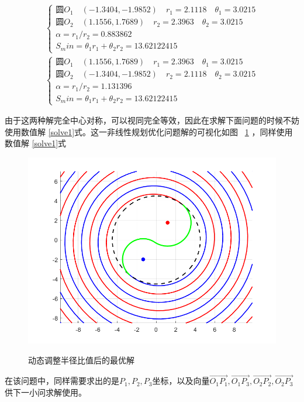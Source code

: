 \documentclass{cumcmthesis1}
\begin{document}
\begin{equation}
\begin{aligned}
    \begin{cases}
        \text{圆}O_1 \quad (-1.3404,-1.9852) \quad r_1=2.1118 \quad \theta_1=3.0215\\
        \text{圆}O_2 \quad (1.1556,1.7689) \quad r_2=2.3963 \quad \theta_2=3.0215\\
        \alpha=r_1/r_2=0.883862\\
        S_min=\theta_1 r_1+\theta_2 r_2=13.62122415
    \end{cases}
\end{aligned}
\label{solve1}
\end{equation}
\begin{align}
    \begin{cases}
        \text{圆}O_1 \quad (1.1556,1.7689) \quad r_1=2.3963 \quad \theta_1=3.0215\\
        \text{圆}O_2 \quad (-1.3404,-1.9852) \quad r_2=2.1118 \quad \theta_2=3.0215\\
        \alpha=r_1/r_2=1.131396\\
        S_min=\theta_1 r_1+\theta_2 r_2=13.62122415
    \end{cases}
\end{align}

由于这两种解完全中心对称，可以视同完全等效，因此在求解下面问题的时候不妨使用数值解
\eqref{solve1}式。这一非线性规划优化问题解的可视化如图 ~\ref{solving}   
，同样使用数值解
\eqref{solve1}式
\begin{figure}[ht]
    \caption{动态调整半径比值后的最优解}
    \centering    
    \includegraphics[width=0.7\linewidth]{111.png}
    \label{solving}
\end{figure}
\par
在该问题中，同样需要求出的是$P_1,P_2,P_3$坐标，以及向量$\overrightarrow{O_1 P_1}, \overrightarrow{O_1 P_3},\overrightarrow{O_2 P_2},\overrightarrow{O_2 P_3}$供下一小问求解使用。
\end{document}
